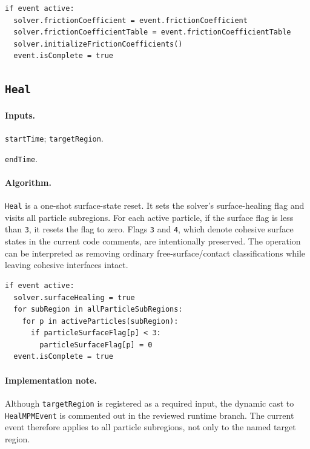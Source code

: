 \begin{lstlisting}[caption={FrictionCoefficientSwap event pseudocode.}]
if event active:
  solver.frictionCoefficient = event.frictionCoefficient
  solver.frictionCoefficientTable = event.frictionCoefficientTable
  solver.initializeFrictionCoefficients()
  event.isComplete = true
\end{lstlisting}

\subsection{\texttt{Heal}}
\label{subsec:event-heal}

\paragraph{Inputs.}
\begin{description}[leftmargin=*,style=nextline]
\item[\textbf{Required.}] \texttt{startTime}; \texttt{targetRegion}.
\item[\textbf{Optional.}] \texttt{endTime}.
\end{description}

\paragraph{Algorithm.}
\texttt{Heal} is a one-shot surface-state reset.  It sets the solver's surface-healing flag and visits all particle subregions.  For each active particle, if the surface flag is less than \texttt{3}, it resets the flag to zero.  Flags \texttt{3} and \texttt{4}, which denote cohesive surface states in the current code comments, are intentionally preserved.  The operation can be interpreted as removing ordinary free-surface/contact classifications while leaving cohesive interfaces intact.

\begin{lstlisting}[caption={Heal event pseudocode.}]
if event active:
  solver.surfaceHealing = true
  for subRegion in allParticleSubRegions:
    for p in activeParticles(subRegion):
      if particleSurfaceFlag[p] < 3:
        particleSurfaceFlag[p] = 0
  event.isComplete = true
\end{lstlisting}

\paragraph{Implementation note.}
Although \texttt{targetRegion} is registered as a required input, the dynamic cast to \texttt{HealMPMEvent} is commented out in the reviewed runtime branch.  The current event therefore applies to all particle subregions, not only to the named target region.


